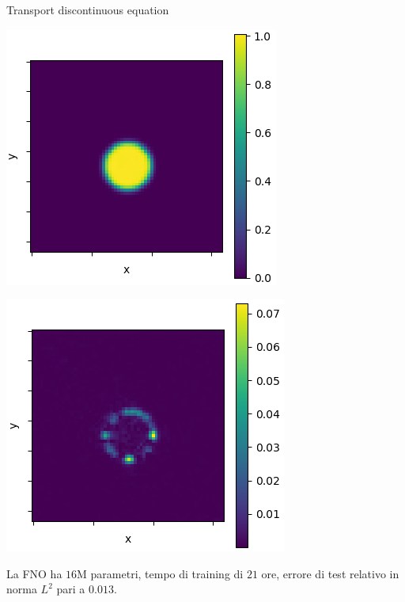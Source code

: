 \documentclass[aspectratio=169]{beamer}
\begin{document}
\begin{frame}[t]{Transport discontinuous equation}
\begin{center}
\begin{minipage}{0.24\textwidth}
        \end{minipage}
        \hfill
        \begin{minipage}{0.24\textwidth}
            \includegraphics[width=\textwidth]{operators/discTrans/FNOappro.png}
        \end{minipage}
        \hfill
        \begin{minipage}{0.24\textwidth}
            \includegraphics[width=\textwidth]{operators/discTrans/error.png}
        \end{minipage}
    \end{center}
    La FNO ha $16$M parametri, tempo di training di $21$ ore, errore di test relativo in norma $L^{2}$ pari a $0.013$.
\end{frame}
\end{document}
